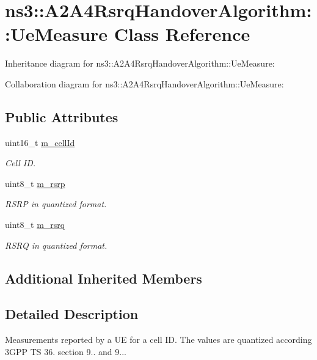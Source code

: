\hypertarget{classns3_1_1A2A4RsrqHandoverAlgorithm_1_1UeMeasure}{}\section{ns3\+:\+:A2\+A4\+Rsrq\+Handover\+Algorithm\+:\+:Ue\+Measure Class Reference}
\label{classns3_1_1A2A4RsrqHandoverAlgorithm_1_1UeMeasure}


Inheritance diagram for ns3\+:\+:A2\+A4\+Rsrq\+Handover\+Algorithm\+:\+:Ue\+Measure\+:


Collaboration diagram for ns3\+:\+:A2\+A4\+Rsrq\+Handover\+Algorithm\+:\+:Ue\+Measure\+:
\subsection*{Public Attributes}
\begin{DoxyCompactItemize}
\item 
uint16\+\_\+t \hyperlink{classns3_1_1A2A4RsrqHandoverAlgorithm_1_1UeMeasure_a2b398af0b82a02df92c70938087041c2}{m\+\_\+cell\+Id}
\begin{DoxyCompactList}\small\item\em Cell ID. \end{DoxyCompactList}\item 
uint8\+\_\+t \hyperlink{classns3_1_1A2A4RsrqHandoverAlgorithm_1_1UeMeasure_a911751668a98f3e5254d60eef5beec7f}{m\+\_\+rsrp}
\begin{DoxyCompactList}\small\item\em R\+S\+RP in quantized format. \end{DoxyCompactList}\item 
uint8\+\_\+t \hyperlink{classns3_1_1A2A4RsrqHandoverAlgorithm_1_1UeMeasure_a1b86db5f2cee0625eb3b98b1c22860d8}{m\+\_\+rsrq}
\begin{DoxyCompactList}\small\item\em R\+S\+RQ in quantized format. \end{DoxyCompactList}\end{DoxyCompactItemize}
\subsection*{Additional Inherited Members}


\subsection{Detailed Description}
Measurements reported by a UE for a cell ID. The values are quantized according 3\+G\+PP TS 36. section 9.. and 9... 

